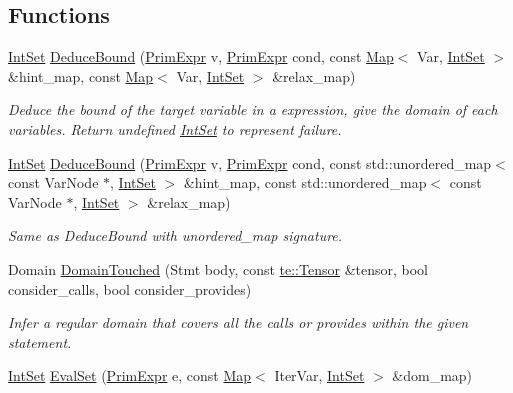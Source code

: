 \subsection*{Functions}
\begin{DoxyCompactItemize}
\item 
\hyperlink{classtvm_1_1arith_1_1IntSet}{Int\+Set} \hyperlink{namespacetvm_1_1arith_af0860828b70ea8ff0d2f7c036c37afd5}{Deduce\+Bound} (\hyperlink{classtvm_1_1PrimExpr}{Prim\+Expr} v, \hyperlink{classtvm_1_1PrimExpr}{Prim\+Expr} cond, const \hyperlink{classtvm_1_1Map}{Map}$<$ Var, \hyperlink{classtvm_1_1arith_1_1IntSet}{Int\+Set} $>$ \&hint\+\_\+map, const \hyperlink{classtvm_1_1Map}{Map}$<$ Var, \hyperlink{classtvm_1_1arith_1_1IntSet}{Int\+Set} $>$ \&relax\+\_\+map)
\begin{DoxyCompactList}\small\item\em Deduce the bound of the target variable in a expression, give the domain of each variables. Return undefined \hyperlink{classtvm_1_1arith_1_1IntSet}{Int\+Set} to represent failure. \end{DoxyCompactList}\item 
\hyperlink{classtvm_1_1arith_1_1IntSet}{Int\+Set} \hyperlink{namespacetvm_1_1arith_a3658d391f2333f405abdd54a9f174c9f}{Deduce\+Bound} (\hyperlink{classtvm_1_1PrimExpr}{Prim\+Expr} v, \hyperlink{classtvm_1_1PrimExpr}{Prim\+Expr} cond, const std\+::unordered\+\_\+map$<$ const Var\+Node $\ast$, \hyperlink{classtvm_1_1arith_1_1IntSet}{Int\+Set} $>$ \&hint\+\_\+map, const std\+::unordered\+\_\+map$<$ const Var\+Node $\ast$, \hyperlink{classtvm_1_1arith_1_1IntSet}{Int\+Set} $>$ \&relax\+\_\+map)
\begin{DoxyCompactList}\small\item\em Same as Deduce\+Bound with unordered\+\_\+map signature. \end{DoxyCompactList}\item 
Domain \hyperlink{namespacetvm_1_1arith_a7f55bb82049e1b5f3a22fbd7b7ef3570}{Domain\+Touched} (Stmt body, const \hyperlink{classtvm_1_1te_1_1Tensor}{te\+::\+Tensor} \&tensor, bool consider\+\_\+calls, bool consider\+\_\+provides)
\begin{DoxyCompactList}\small\item\em Infer a regular domain that covers all the calls or provides within the given statement. \end{DoxyCompactList}\item 
\hyperlink{classtvm_1_1arith_1_1IntSet}{Int\+Set} \hyperlink{namespacetvm_1_1arith_a73160d1f944121ad2ef22205dd496fdc}{Eval\+Set} (\hyperlink{classtvm_1_1PrimExpr}{Prim\+Expr} e, const \hyperlink{classtvm_1_1Map}{Map}$<$ Iter\+Var, \hyperlink{classtvm_1_1arith_1_1IntSet}{Int\+Set} $>$ \&dom\+\_\+map)

\end{DoxyCompactItemize}
